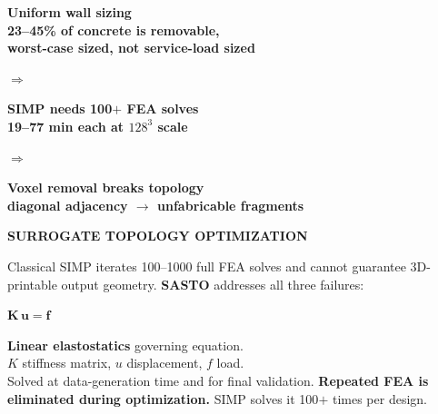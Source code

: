 \documentclass[10pt]{article}
\newenvironment{ccard}{%
  \begin{tcolorbox}[
    colback=cardfill, colframe=cardbdr,
    boxrule=0.5pt, arc=4pt, outer arc=4pt,
    left=3.5mm, right=3.5mm, top=2.5mm, bottom=2.5mm,
    width=\linewidth
  ]%
}{%
  \end{tcolorbox}%
}
\newcommand{\sub}[1]{%
  {\color{secbar}\bfseries\large #1}\par\vspace{1mm}}
\newlength{\LC}  \setlength{\LC} {29.72cm}
\begin{document}
\begin{minipage}[t]{\LC}
\begin{ccard}
  \vspace{3mm}
  \begin{minipage}[c]{7.8cm}
    \begin{tcolorbox}[colback=secbar!10,colframe=secbar,arc=3pt,
      left=2mm,right=2mm,top=1.5mm,bottom=1.5mm,width=\linewidth]
      \centering\small\bfseries\color{secbar}
      Uniform wall sizing\\[-1pt]
      {\normalfont\footnotesize 23--45\% of concrete is removable,\\[-1pt]
        worst-case sized, not service-load sized}
    \end{tcolorbox}
  \end{minipage}%
  \hfill{\color{gold}\Large$\Rightarrow$}\hfill
  \begin{minipage}[c]{8.5cm}
    \begin{tcolorbox}[colback=secbar!10,colframe=secbar,arc=3pt,
      left=2mm,right=2mm,top=1.5mm,bottom=1.5mm,width=\linewidth]
      \centering\small\bfseries\color{secbar}
      SIMP needs 100$+$ FEA solves\\[-1pt]
      {\normalfont\footnotesize 19--77 min each at $128^3$ scale}
    \end{tcolorbox}
  \end{minipage}%
  \hfill{\color{gold}\Large$\Rightarrow$}\hfill
  \begin{minipage}[c]{9.0cm}
    \begin{tcolorbox}[colback=secbar!10,colframe=secbar,arc=3pt,
      left=2mm,right=2mm,top=1.5mm,bottom=1.5mm,width=\linewidth]
      \centering\small\bfseries\color{secbar}
      Voxel removal breaks topology\\[-1pt]
      {\normalfont\footnotesize diagonal adjacency $\to$ unfabricable
        fragments}
    \end{tcolorbox}
  \end{minipage}

  \vspace{3mm}
  \sub{SURROGATE TOPOLOGY OPTIMIZATION}
  \small\RaggedRight
  Classical SIMP iterates 100--1000 full FEA solves and cannot guarantee
  3D-printable output geometry. \textbf{SASTO} addresses all three failures:

  \vspace{2mm}
  \begin{minipage}[c]{0.41\linewidth}
    \centering
    \Large\color{secbar}$\mathbf{K\,u = f}$
  \end{minipage}%
  \begin{minipage}[c]{0.57\linewidth}
    \small\RaggedRight
    \textbf{Linear elastostatics} governing equation.\\
    $K$ stiffness matrix, \;$u$ displacement, \;$f$ load.\\[2pt]
    Solved at data-generation time and for final validation.
    \textbf{Repeated FEA is eliminated during optimization.}
    SIMP solves it 100$+$ times per design.
  \end{minipage}


\end{ccard}
\end{minipage}
\end{document}
